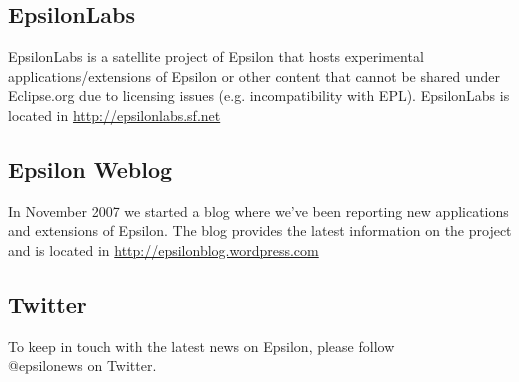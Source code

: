 \subsection{EpsilonLabs}

EpsilonLabs is a satellite project of Epsilon that hosts experimental applications/extensions of Epsilon or other content that cannot be shared under Eclipse.org due to licensing issues (e.g. incompatibility with EPL). EpsilonLabs is located in \url{http://epsilonlabs.sf.net}

\subsection{Epsilon Weblog}
In November 2007 we started a blog where we've been reporting new applications and extensions of Epsilon. The blog provides the latest information on the project and is located in \url{http://epsilonblog.wordpress.com}

\subsection{Twitter}
To keep in touch with the latest news on Epsilon, please follow \\@epsilonews on Twitter.